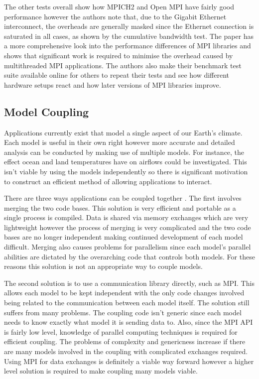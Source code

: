 \documentclass{acm_proc_article-sp}
\renewcommand{\_}{\underscore\hspace{0pt}}
\begin{document}
The other tests overall show how MPICH2 and Open MPI have fairly good
performance however the authors note that, due to the Gigabit Ethernet
interconnect, the overheads are generally masked since the Ethernet connection
is saturated in all cases, as shown by the cumulative bandwidth test. The paper
has a more comprehensive look into the performance differences of MPI libraries
and shows that significant work is required to minimise the overhead caused by
multithreaded MPI applications. The authors also make their benchmark test suite
available online for others to repeat their tests and see how different hardware
setups react and how later versions of MPI libraries improve.

\subsection*{Model Coupling}

Applications currently exist that model a single aspect of our Earth's climate.
Each model is useful in their own right however more accurate and detailed
analysis can be conducted by making use of multiple models. For instance, the
effect ocean and land temperatures have on airflows could be investigated. This
isn't viable by using the models independently so there is significant
motivation to construct an efficient method of allowing applications to
interact.

There are three ways applications can be coupled together \cite{Thevenin}. The
first involves merging the two code bases. This solution is very efficient and
portable as a single process is compiled. Data is shared via memory exchanges
which are very lightweight however the process of merging is very complicated
and the two code bases are no longer independent making continued development of
each model difficult. Merging also causes problems for parallelism since each
model's parallel abilities are dictated by the overarching code that controls
both models. For these reasons this solution is not an appropriate way to couple
models.

The second solution \cite{Thevenin} is to use a communication library directly,
such as MPI. This allows each model to be kept independent with the only code
changes involved being related to the communication between each model itself.
The solution still suffers from many problems. The coupling code isn't generic
since each model needs to know exactly what model it is sending data to. Also,
since the MPI API is fairly low level, knowledge of parallel computing
techniques is required for efficient coupling. The problems of complexity and
genericness increase if there are many models involved in the coupling with
complicated exchanges required. Using MPI for data exchanges is definitely a
viable way forward however a higher level solution is required to make coupling
many models viable.
\end{document}
